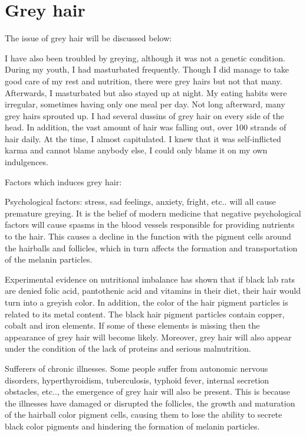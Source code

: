 \documentclass[
]{book}
\begin{document}
\hypertarget{grey-hair}{%
\section{Grey hair}\label{grey-hair}}

The issue of grey hair will be discussed below:

I have also been troubled by greying, although it was not a genetic condition. During my youth, I had masturbated frequently. Though I did manage to take good care of my rest and nutrition, there were grey hairs but not that many. Afterwards, I masturbated but also stayed up at night. My eating habits were irregular, sometimes having only one meal per day. Not long afterward, many grey hairs sprouted up. I had several dussins of grey hair on every side of the head. In addition, the vast amount of hair was falling out, over 100 strands of hair daily. At the time, I almost capitulated. I knew that it was self-inflicted karma and cannot blame anybody else, I could only blame it on my own indulgences.

Factors which induces grey hair:

Psychological factors: stress, sad feelings, anxiety, fright, etc.. will all cause premature greying. It is the belief of modern medicine that negative psychological factors will cause spasms in the blood vessels responsible for providing nutrients to the hair. This causes a decline in the function with the pigment cells around the hairballs and follicles, which in turn affects the formation and transportation of the melanin particles.

Experimental evidence on nutritional imbalance has shown that if black lab rats are denied folic acid, pantothenic acid and vitamins in their diet, their hair would turn into a greyish color. In addition, the color of the hair pigment particles is related to its metal content. The black hair pigment particles contain copper, cobalt and iron elements. If some of these elements is missing then the appearance of grey hair will become likely. Moreover, grey hair will also appear under the condition of the lack of proteins and serious malnutrition.

Sufferers of chronic illnesses. Some people suffer from autonomic nervous disorders, hyperthyroidism, tuberculosis, typhoid fever, internal secretion obstacles, etc.., the emergence of grey hair will also be present. This is because the illnesses have damaged or disrupted the follicles, the growth and maturation of the hairball color pigment cells, causing them to lose the ability to secrete black color pigments and hindering the formation of melanin particles.
\end{document}
